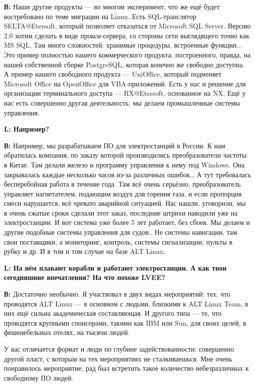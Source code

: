 \documentclass[10pt, a5paper]{article}
\begin{document}
{\noindent \bf В:} Наши другие продукты --- во многом эксперимент, что же ещё будет востребовано по теме миграции на Linux. Есть SQL-транслятор SELTA@Etersoft, который позволяет отказаться от Microsoft SQL Server. Версию 2.0 хотим сделать в виде прокси-сервера, со стороны сети выглядящего точно как MS SQL. Там много сложностей: хранимые процедуры, встроенные функции... Это пример полностью нашего коммерческого продукта, построенного, правда, на нашей собственной сборке PostgreSQL, которая конечно же свободно доступна. А пример нашего свободного продукта --- UniOffice, который  подменяет Microsoft Office на OpenOffice для VBA-приложений. Есть у нас и решение для организации терминального доступа --- RX@Etersoft, основанное на NX. Ещё у нас есть совершенно другая деятельность: мы делаем промышленные системы управления. 

{\noindent \bf L: Например?}

{\noindent \bf В:} Например, мы разрабатываем ПО для электростанций в России. К нам обратилась компания, по заказу которой производились преобразователи частоты в Китае. Там делали железо и программу управления к нему под Windows. Она закрывалась каждые несколько часов из-за различных ошибок… А тут требовалась бесперебойная работа в течение года. Там всё очень серьёзно, преобразователь управляет нагнетателем, подающим воздух для горения газа, и если пропорция смеси нарушается, всё чревато аварийной ситуацией. Нас нашли, уговорили, мы в очень сжатые сроки сделали этот заказ, последние штрихи наводили уже на электростанции. И вот система уже более 5 лет работает, без сбоев. Мы делаем и другие подобные системы управления для судов:. Не системы навигации, там свои поставщики, а мониторинг, контроль, системы сигнализации, пульты в рубку и др. И в том и том случае на базе ALT Linux. 

{\noindent \bf L: На нём плавают корабли и работают электростанции. А как твои сегодняшние впечатления? На что похоже LVEE?}

{\noindent \bf В:} Достаточно необычно. Я участвовал в двух видах мероприятий: тех, что проводятся ALT Linux --- в основном с людьми, близкими к ALT Linux Team, в них ещё сильна академическая составляющая. И другого типа --- те, что проводятся крупными спонсорами, такими как IBM или Sun, для своих целей, в фешенебельных отелях,  на тысячи людей.

У вас отличается формат и люди по глубине задействованности: совершенно другой пласт, с которым на тех мероприятиях не сталкиваешься. Мне очень понравилось мероприятие, рад был встретить такое количество небезразличных к свободному ПО людей.
\end{document}

